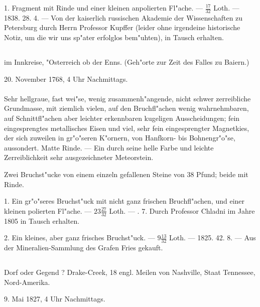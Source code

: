 \documentclass[a4paper, 11pt, oneside, polutonikogreek, german]{article}
\begin{document}
1. Fragment mit Rinde und einer kleinen anpolierten Fl"ache. --- $\mathfrak{\frac{17}{32}}$ Loth. --- 1838. 28. 4. --- Von der kaiserlich russischen Akademie der Wissenschaften zu Petersburg durch Herrn Professor Kupffer (leider ohne irgendeine historische Notiz, um die wir uns sp"ater erfolglos bem"uhten), in Tausch erhalten.
\subsection[\swabfamily {Mauerkirchen.}]{}
\begin{center}

im Innkreise, "Osterreich ob der Enns. (Geh"orte zur Zeit des Falles zu Baiern.)

20. November 1768, 4 Uhr Nachmittags.
\end{center}
\paragraph{}
Sehr hellgraue, fast wei"se, wenig zusammenh"angende, nicht schwer zerreibliche Grundmasse, mit ziemlich vielen, auf den Bruchfl"achen wenig wahrnehmbaren, auf Schnittfl"achen aber leichter erkennbaren kugeligen Ausscheidungen; fein eingesprengtes metallisches Eisen und viel, sehr fein eingesprengter Magnetkies, der sich zuweilen in gr"o"seren K"ornern, von Hanfkorn- bis Bohnengr"o"se, aussondert. Matte Rinde. --- Ein durch seine helle Farbe und leichte Zerreiblichkeit sehr ausgezeichneter Meteorstein.

Zwei Bruchst"ucke von einem einzeln gefallenen Steine von 38 Pfund; beide mit Rinde.

1. Ein gr"o"seres Bruchst"uck mit nicht ganz frischen Bruchfl"achen, und einer kleinen polierten Fl"ache. --- $\mathfrak{23\frac{27}{32}}$ Loth. --- . 7. Durch Professor Chladni im Jahre 1805 in Tausch erhalten.

2. Ein kleines, aber ganz frisches Bruchst"uck. --- $\mathfrak{9\frac{13}{32}}$ Loth. --- 1825. 42. 8. --- Aus der Mineralien-Sammlung des Grafen Fries gekauft.
\subsection{}
\begin{center}

Dorf oder Gegend ? Drake-Creek, 18 engl. Meilen von Nashville, Staat Tennessee, Nord-Amerika.

9. Mai 1827, 4 Uhr Nachmittags.
\end{center}
\end{document}
